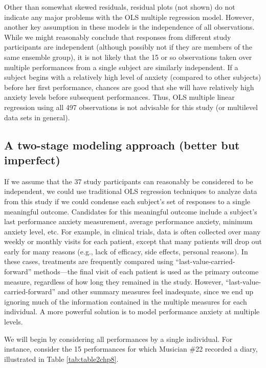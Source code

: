 \documentclass[
]{krantz}
\begin{document}
Other than somewhat skewed residuals, residual plots (not shown) do not indicate any major problems with the OLS multiple regression model. However, another key assumption in these models is the independence of all observations. While we might reasonably conclude that responses from different study participants are independent (although possibly not if they are members of the same ensemble group), it is not likely that the 15 or so observations taken over multiple performances from a single subject are similarly independent. If a subject begins with a relatively high level of anxiety (compared to other subjects) before her first performance, chances are good that she will have relatively high anxiety levels before subsequent performances. Thus, OLS multiple linear regression using all 497 observations is not advisable for this study (or multilevel data sets in general).

\hypertarget{twostage}{%
\subsection{A two-stage modeling approach (better but imperfect)}\label{twostage}}

If we assume that the 37 study participants can reasonably be considered to be independent, we could use traditional OLS regression techniques to analyze data from this study if we could condense each subject's set of responses to a single meaningful outcome. Candidates for this meaningful outcome include a subject's last performance anxiety measurement, average performance anxiety, minimum anxiety level, etc. For example, in clinical trials, data is often collected over many weekly or monthly visits for each patient, except that many patients will drop out early for many reasons (e.g., lack of efficacy, side effects, personal reasons). In these cases, treatments are frequently compared using ``last-value-carried-forward'' methods---the final visit of each patient is used as the primary outcome measure, regardless of how long they remained in the study. However, ``last-value-carried-forward'' and other summary measures feel inadequate, since we end up ignoring much of the information contained in the multiple measures for each individual. A more powerful solution is to model performance anxiety at multiple levels.

We will begin by considering all performances by a single individual. For instance, consider the 15 performances for which Musician \#22 recorded a diary, illustrated in Table \ref{tab:table2chp8}.
\end{document}
